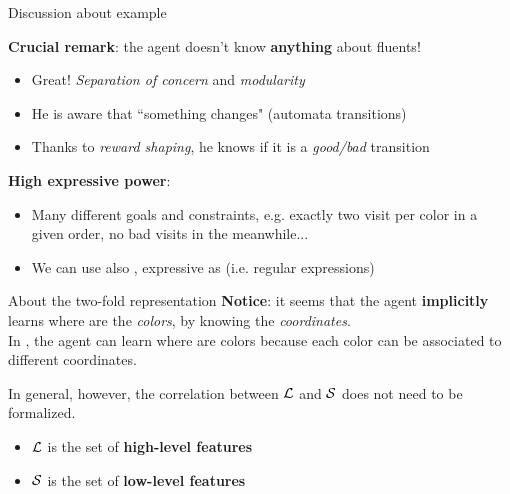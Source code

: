 \documentclass{beamer}
\begin{document}
\begin{frame}{Discussion about \Sapientino example}
	
	\textbf{Crucial remark}: the agent doesn't know \textbf{anything} about fluents!
	\begin{itemize}
		\item Great! \emph{Separation of concern} and \emph{modularity}
		\item He is aware that ``something changes" (automata transitions)
		\item Thanks to \emph{reward shaping}, he knows if it is a \emph{good/bad} transition
	\end{itemize}
	
	\vspace{0.5cm}
	\textbf{High expressive power}:
	\begin{itemize}
	\item Many different goals and constraints, e.g. exactly two visit per color in a given order, no bad visits in the meanwhile...
	
	\item We can use also \LDLf, expressive as \MSO (i.e. regular expressions)
	\end{itemize}
	
\end{frame}

\begin{frame}{About the two-fold representation}
	\textbf{Notice}: it seems that the agent \textbf{implicitly} learns where are the \emph{colors}, by knowing the \emph{coordinates}.\\
	
	\vspace{0.3cm}
	In \Sapientino, the agent can learn where are colors because each color can be associated to different coordinates.
	
	\vspace{0.3cm}
	In general, however, the correlation between $\L$ and $\S$ does not need to be formalized.
	\begin{itemize}
		\item $\L$ is the set of \textbf{high-level features}
		\item $\S$ is the set of \textbf{low-level features}
	\end{itemize}
	
	
\end{frame}
\end{document}
